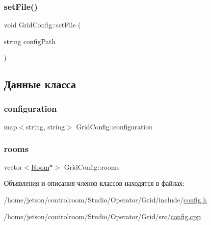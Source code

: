 \mbox{\label{class_grid_config_a06a311c3bc17bebae00cb6573378730f}} 
\subsubsection{\texorpdfstring{set\+File()}{setFile()}}
{\footnotesize\ttfamily void Grid\+Config\+::set\+File (\begin{DoxyParamCaption}\item[{string}]{config\+Path }\end{DoxyParamCaption})}



\subsection{Данные класса}
\mbox{\label{class_grid_config_a9a956728ff118aeb9c1f9b249c50f250}} 
\subsubsection{\texorpdfstring{configuration}{configuration}}
{\footnotesize\ttfamily map$<$string, string$>$ Grid\+Config\+::configuration\hspace{0.3cm}{\ttfamily [private]}}

\mbox{\label{class_grid_config_a1fc61cb11f7c487b1af888f8618a238f}} 
\subsubsection{\texorpdfstring{rooms}{rooms}}
{\footnotesize\ttfamily vector$<$\hyperlink{class_room}{Room}$\ast$$>$ Grid\+Config\+::rooms\hspace{0.3cm}{\ttfamily [private]}}



Объявления и описания членов классов находятся в файлах\+:\begin{DoxyCompactItemize}
\item 
/home/jetson/controlroom/\+Studio/\+Operator/\+Grid/include/\hyperlink{_operator_2_grid_2include_2config_8h}{config.\+h}\item 
/home/jetson/controlroom/\+Studio/\+Operator/\+Grid/src/\hyperlink{_operator_2_grid_2src_2config_8cpp}{config.\+cpp}\end{DoxyCompactItemize}
